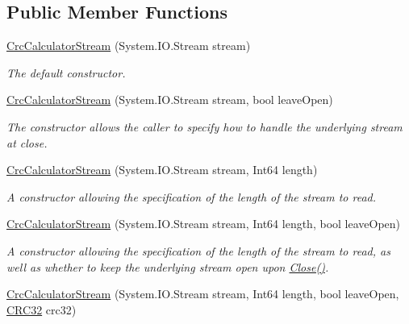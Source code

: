 \subsection*{Public Member Functions}
\begin{DoxyCompactItemize}
\item 
\mbox{\hyperlink{class_super_tiled2_unity_1_1_ionic_1_1_crc_1_1_crc_calculator_stream_a9c07a721e770fb603dd764c572a0eba6}{Crc\+Calculator\+Stream}} (System.\+I\+O.\+Stream stream)
\begin{DoxyCompactList}\small\item\em The default constructor. \end{DoxyCompactList}\item 
\mbox{\hyperlink{class_super_tiled2_unity_1_1_ionic_1_1_crc_1_1_crc_calculator_stream_a69ee8f78e7559698ab9c4e23618e184e}{Crc\+Calculator\+Stream}} (System.\+I\+O.\+Stream stream, bool leave\+Open)
\begin{DoxyCompactList}\small\item\em The constructor allows the caller to specify how to handle the underlying stream at close. \end{DoxyCompactList}\item 
\mbox{\hyperlink{class_super_tiled2_unity_1_1_ionic_1_1_crc_1_1_crc_calculator_stream_a51e8a4bd2e462dd66b58881a9aae18fc}{Crc\+Calculator\+Stream}} (System.\+I\+O.\+Stream stream, Int64 length)
\begin{DoxyCompactList}\small\item\em A constructor allowing the specification of the length of the stream to read. \end{DoxyCompactList}\item 
\mbox{\hyperlink{class_super_tiled2_unity_1_1_ionic_1_1_crc_1_1_crc_calculator_stream_aafb4e4ec8f06aa21aa7ace5f2d254d79}{Crc\+Calculator\+Stream}} (System.\+I\+O.\+Stream stream, Int64 length, bool leave\+Open)
\begin{DoxyCompactList}\small\item\em A constructor allowing the specification of the length of the stream to read, as well as whether to keep the underlying stream open upon \mbox{\hyperlink{class_super_tiled2_unity_1_1_ionic_1_1_crc_1_1_crc_calculator_stream_af4509c6b2480109b3b52f3881b5a8f5f}{Close()}}. \end{DoxyCompactList}\item 
\mbox{\hyperlink{class_super_tiled2_unity_1_1_ionic_1_1_crc_1_1_crc_calculator_stream_a7c9c19515f0ebe98d6b72bf663932dc2}{Crc\+Calculator\+Stream}} (System.\+I\+O.\+Stream stream, Int64 length, bool leave\+Open, \mbox{\hyperlink{class_super_tiled2_unity_1_1_ionic_1_1_crc_1_1_c_r_c32}{C\+R\+C32}} crc32)

\end{DoxyCompactItemize}
